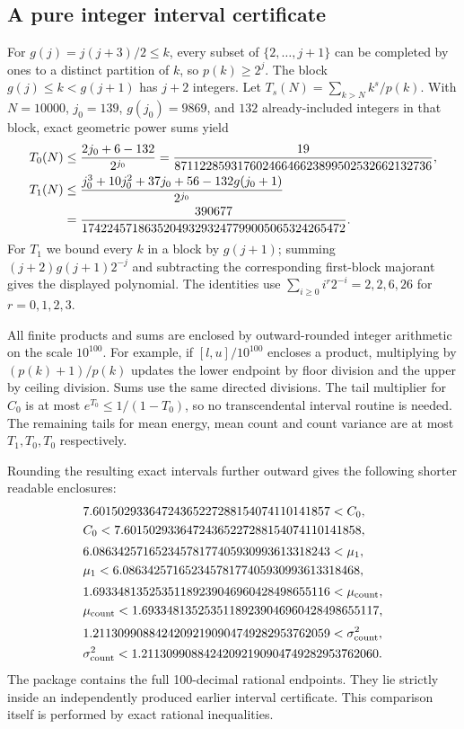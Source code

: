 \documentclass[11pt]{article}
\theoremstyle{remark}\newtheorem{remark}[theorem]{Remark}
\begin{document}
\subsection{A pure integer interval certificate}
For $g(j)=j(j+3)/2\le k$, every subset of $\{2,\ldots,j+1\}$ can be completed by ones to a distinct partition of $k$, so $p(k)\ge2^j$. The block $g(j)\le k<g(j+1)$ has $j+2$ integers. Let $T_s(N)=\sum_{k>N}k^s/p(k)$. With $N=10000$, $j_0=139$, $g(j_0)=9869$, and $132$ already-included integers in that block, exact geometric power sums yield
\begin{align}
 T_0(N)&\le\frac{2j_0+6-132}{2^{j_0}}
 =\frac{19}{87112285931760246646623899502532662132736},\label{stp:sum:eq:T0}\\
 T_1(N)&\le\frac{j_0^3+10j_0^2+37j_0+56-132g(j_0+1)}{2^{j_0}}\notag\\
 &=\frac{390677}{174224571863520493293247799005065324265472}.
 \label{stp:sum:eq:T1}
\end{align}
For $T_1$ we bound every $k$ in a block by $g(j+1)$; summing $(j+2)g(j+1)2^{-j}$ and subtracting the corresponding first-block majorant gives the displayed polynomial. The identities use
$\sum_{i\ge0}i^r2^{-i}=2,2,6,26$ for $r=0,1,2,3$.

All finite products and sums are enclosed by outward-rounded integer arithmetic on the scale $10^{100}$. For example, if $[l,u]/10^{100}$ encloses a product, multiplying by $(p(k)+1)/p(k)$ updates the lower endpoint by floor division and the upper by ceiling division. Sums use the same directed divisions. The tail multiplier for $C_0$ is at most $e^{T_0}\le1/(1-T_0)$, so no transcendental interval routine is needed. The remaining tails for mean energy, mean count and count variance are at most $T_1,T_0,T_0$ respectively.

Rounding the resulting exact intervals further outward gives the following shorter readable enclosures:
\begin{align*}
 &7.60150293364724365227288154074110141857<C_0,\\
 &C_0<7.60150293364724365227288154074110141858,\\[2pt]
 &6.08634257165234578177405930993613318243<\mu_1,\\
 &\mu_1<6.08634257165234578177405930993613318468,\\[2pt]
 &1.69334813525351189239046960428498655116<\mu_{\rm count},\\
 &\mu_{\rm count}<1.69334813525351189239046960428498655117,\\[2pt]
 &1.21130990884242092190904749282953762059<\sigma_{\rm count}^2,\\
 &\sigma_{\rm count}^2<1.21130990884242092190904749282953762060.
\end{align*}
The package contains the full 100-decimal rational endpoints. They lie strictly inside an independently produced earlier interval certificate. This comparison itself is performed by exact rational inequalities.
\end{document}

